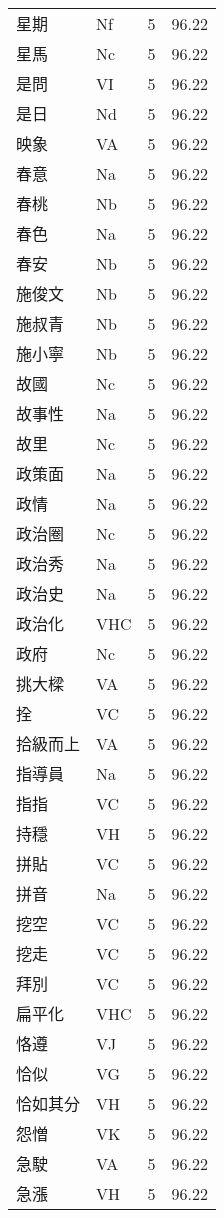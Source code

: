 \documentclass[twocolumn]{book}
\begin{document}
\begin{supertabular}{llrr}
星期 & Nf & 5 &  96.22\\
星馬 & Nc & 5 &  96.22\\
是問 & VI & 5 &  96.22\\
是日 & Nd & 5 &  96.22\\
映象 & VA & 5 &  96.22\\
春意 & Na & 5 &  96.22\\
春桃 & Nb & 5 &  96.22\\
春色 & Na & 5 &  96.22\\
春安 & Nb & 5 &  96.22\\
施俊文 & Nb & 5 &  96.22\\
施叔青 & Nb & 5 &  96.22\\
施小寧 & Nb & 5 &  96.22\\
故國 & Nc & 5 &  96.22\\
故事性 & Na & 5 &  96.22\\
故里 & Nc & 5 &  96.22\\
政策面 & Na & 5 &  96.22\\
政情 & Na & 5 &  96.22\\
政治圈 & Nc & 5 &  96.22\\
政治秀 & Na & 5 &  96.22\\
政治史 & Na & 5 &  96.22\\
政治化 & VHC & 5 &  96.22\\
政府 & Nc & 5 &  96.22\\
挑大樑 & VA & 5 &  96.22\\
拴 & VC & 5 &  96.22\\
拾級而上 & VA & 5 &  96.22\\
指導員 & Na & 5 &  96.22\\
指指 & VC & 5 &  96.22\\
持穩 & VH & 5 &  96.22\\
拼貼 & VC & 5 &  96.22\\
拼音 & Na & 5 &  96.22\\
挖空 & VC & 5 &  96.22\\
挖走 & VC & 5 &  96.22\\
拜別 & VC & 5 &  96.22\\
扁平化 & VHC & 5 &  96.22\\
恪遵 & VJ & 5 &  96.22\\
恰似 & VG & 5 &  96.22\\
恰如其分 & VH & 5 &  96.22\\
怨憎 & VK & 5 &  96.22\\
急駛 & VA & 5 &  96.22\\
急漲 & VH & 5 &  96.22\\

\end{supertabular}
\end{document}
